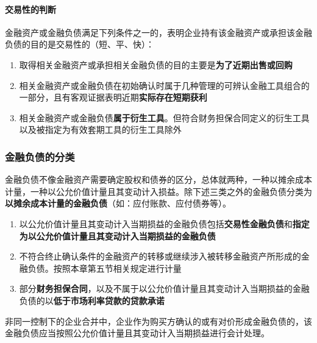 \documentclass[UTF8,12pt]{ctexart}
\numberwithin{equation}{section} %
\numberwithin{figure}{section}
\numberwithin{table}{section}
\begin{document}
	\paragraph{交易性的判断}
	
	金融资产或金融负债满足下列条件之一的，表明企业持有该金融资产或承担该金融负债的目的是交易性的（短、平、快）：
	\begin{enumerate}
		\item 取得相关金融资产或承担相关金融负债的目的主要是\textbf{为了近期出售或回购}
		
		\item 相关金融资产或金融负债在初始确认时属于几种管理的可辨认金融工具组合的一部分，且有客观证据表明近期\textbf{实际存在短期获利}
		
		\item 相关金融资产或金融负债\textbf{属于衍生工具}。但符合财务担保合同定义的衍生工具以及被指定为有效套期工具的衍生工具除外
	\end{enumerate}
	

	
	\subsubsection{金融负债的分类}
	
	金融负债不像金融资产需要确定股权和债券的区分，总体就两种，一种以摊余成本计量，一种以公允价值计量且其变动计入损益。除下述三类之外的金融负债分类为\textbf{以摊余成本计量的金融负债}（如：应付账款、应付债券等）。
	
	\begin{enumerate}
		\item 以公允价值计量且其变动计入当期损益的金融负债包括\textbf{交易性金融负债}和\textbf{指定为以公允价值计量且其变动计入当期损益的金融负债}
		
		\item 不符合终止确认条件的金融资产的转移或继续涉入被转移金融资产所形成的金融负债。按照本章第五节相关规定进行计量
		
		\item 部分\textbf{财务担保合同}，以及不属于以公允价值计量且其变动计入当期损益的金融负债的以\textbf{低于市场利率贷款的贷款承诺}
		
	\end{enumerate}

	非同一控制下的企业合并中，企业作为购买方确认的或有对价形成金融负债的，该金融负债应当按照公允价值计量且其变动计入当期损益进行会计处理。
	
\end{document}
